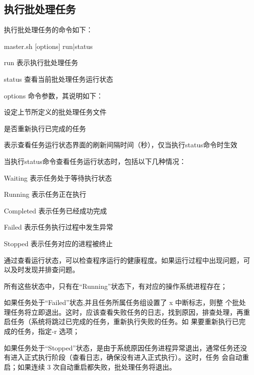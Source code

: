 \subsection{执行批处理任务}
执行批处理任务的命令如下：
\begin{scriptcode} master.sh [options] run|status \end{scriptcode}

\begin{para}
\item[run] 表示执行批处理任务
\item[status] 查看当前批处理任务运行状态
\item[options] 命令参数，其说明如下：
\begin{cit}
\item {} 设定上节所定义的批处理任务文件
\item {} 是否重新执行已完成的任务
\item {} 表示查看任务运行状态界面的刷新间隔时间（秒），仅当执行status命令时生效
\end{cit}
\end{para}

当执行status命令查看任务运行状态时，包括以下几种情况：
\begin{para}
\item[Waiting] 表示任务处于等待执行状态
\item[Running] 表示任务正在执行 
\item[Completed] 表示任务已经成功完成
\item[Failed] 表示任务执行过程中发生异常
\item[Stopped] 表示任务对应的进程被终止 
\end{para}

通过查看运行状态，可以检查程序运行的健康程度。如果运行过程中出现问题，可以及时发现并排查问题。
\begin{nbeae}
\item 所有这些状态中，只有在“Running”状态下，有对应的操作系统进程存在；
\item 如果任务处于“Failed”状态,并且任务所属任务组设置了 x 中断标志，则整
个批处理任务将立即退出。这时，应该查看失败任务的日志，找到原因，排查处理，再重启任务（系统将跳过已完成的任务，重新执行失败的任务。如
果要重新执行已完成的任务，指定-r 选项；
\item 如果任务处于“Stopped”状态，是由于系统原因任务进程异常退出，通常任务还没有进入正式执行阶段（查看日志，确保没有进入正式执行）。这时，任务
会自动重启；如果连续 3 次自动重启都失败，批处理任务将退出。
\end{nbeae}


